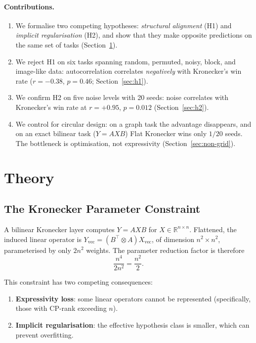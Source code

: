 \documentclass[11pt,a4paper]{article}
\begin{document}
\paragraph{Contributions.}
\begin{enumerate}
\item We formalise two competing hypotheses: \emph{structural
alignment} (H1) and \emph{implicit regularisation} (H2), and show
that they make opposite predictions on the same set of tasks
(Section~\ref{sec:theory}).
\item We reject H1 on six tasks spanning random, permuted, noisy,
block, and image-like data: autocorrelation correlates
\emph{negatively} with Kronecker's win rate
($r = -0.38$, $p = 0.46$; Section~\ref{sec:h1}).
\item We confirm H2 on five noise levels with 20 seeds: noise
correlates with Kronecker's win rate at $r = +0.95$,
$p = 0.012$ (Section~\ref{sec:h2}).
\item We control for circular design: on a graph task the
advantage disappears, and on an exact bilinear task
($Y = AXB$) Flat Kronecker wins only $1/20$ seeds. The bottleneck
is optimisation, not expressivity (Section~\ref{sec:non-grid}).
\end{enumerate}


\section{Theory}
\label{sec:theory}

\subsection{The Kronecker Parameter Constraint}
\label{sec:constraint}

A bilinear Kronecker layer computes $Y = A X B$ for
$X \in \mathbb{R}^{n \times n}$. Flattened, the induced linear
operator is $Y_{\text{vec}} = (B^\top \otimes A) X_{\text{vec}}$,
of dimension $n^2 \times n^2$, parameterised by only $2n^2$
weights. The parameter reduction factor is therefore
\begin{equation}
\frac{n^4}{2n^2} = \frac{n^2}{2}.
\label{eq:reduction}
\end{equation}

This constraint has two competing consequences:
\begin{enumerate}
\item \textbf{Expressivity loss}: some linear operators cannot be
represented (specifically, those with CP-rank exceeding $n$).
\item \textbf{Implicit regularisation}: the effective hypothesis
class is smaller, which can prevent overfitting.
\end{enumerate}
\end{document}
